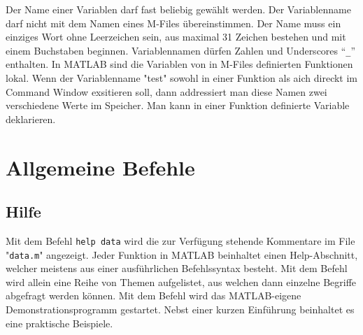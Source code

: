 \newline\newline
Der Name einer Variablen darf fast beliebig gewählt werden. Der Variablenname darf nicht mit dem Namen eines M-Files übereinstimmen. Der Name muss ein einziges Wort ohne Leerzeichen sein, aus maximal 31 Zeichen bestehen und mit einem Buchstaben beginnen. Variablennamen dürfen Zahlen und Underscores ``{\color{red}\texttt{\_}}'' enthalten. In MATLAB sind die Variablen von in M-Files definierten Funktionen lokal. Wenn der Variablenname "test" sowohl in einer Funktion als aich direckt im Command Window exsitieren soll, dann addressiert man diese Namen zwei verschiedene Werte im Speicher. Man kann in einer Funktion definierte Variable  deklarieren.
\section{Allgemeine Befehle}
\subsection{Hilfe}
Mit dem Befehl {\color{red}\texttt{help data}} wird die zur Verfügung stehende Kommentare im File "\texttt{data.m}" angezeigt. Jeder Funktion in MATLAB beinhaltet einen Help-Abschnitt, welcher meistens aus einer ausführlichen Befehlssyntax besteht.
\newline\newline
Mit dem Befehl  wird allein eine Reihe von Themen aufgelistet, aus welchen dann einzelne Begriffe abgefragt werden können.
\newline\newline
Mit dem Befehl  wird das MATLAB-eigene Demonstrationsprogramm gestartet. Nebst einer kurzen Einführung beinhaltet es eine praktische Beispiele.
\newline\newline
